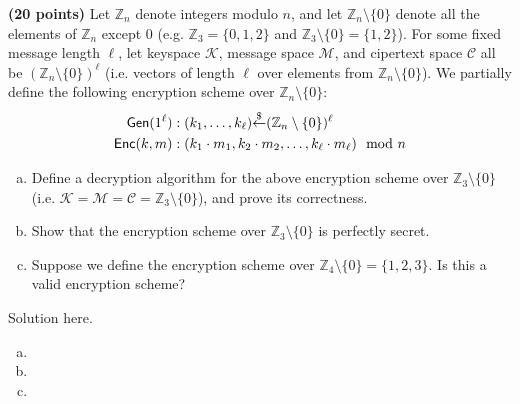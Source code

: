 \documentclass[12pt]{hw}
\begin{document}
\begin{exercise}
  \textbf{(20 points)} Let $\mathbb{Z}_n$ denote integers modulo $n$,
and let $\mathbb{Z}_n \setminus \{0\}$ denote all the elements of $\mathbb{Z}_n$ except $0$ (e.g. $\mathbb{Z}_3 = \{0, 1, 2\}$ and $\mathbb{Z}_3 \setminus \{0\} = \{1, 2\}$). 
For some fixed message length $\ell$,
let keyspace $\mathcal{K}$, message space $\mathcal{M}$, and cipertext space $\mathcal{C}$ all be $(\mathbb{Z}_{n} \setminus \{0\})^\ell$ (i.e. vectors of length $\ell$ over elements from $\mathbb{Z}_{n} \setminus \{0\}$).
We partially define the following encryption scheme over $\mathbb{Z}_n \setminus \{0\}$:
\begin{align*}
    \mathsf{Gen}(1^\ell) &: (k_1, \dots, k_\ell) {\overset{\$}{\leftarrow}} (\mathbb{Z}_{n} \setminus \{0\})^\ell\\
    \mathsf{Enc}(k, m) &: (k_1 \cdot m_1, k_2 \cdot m_2, \dots, k_\ell \cdot m_\ell)\mod n
\end{align*}
\begin{enumerate}[(a)]
    \item Define a decryption algorithm for the above encryption scheme over $\mathbb{Z}_3 \setminus \{0\}$
    (i.e. $\mathcal{K} = \mathcal{M} = \mathcal{C} = \mathbb{Z}_{3} \setminus \{0\}$), 
    and prove its correctness.
    \item 
    Show that the encryption scheme over $\mathbb{Z}_{3} \setminus \{0\}$ is perfectly secret.
    \item Suppose we define the encryption scheme over $\mathbb{Z}_4 \setminus \{0\}=\{1,2,3\}$. 
    Is this a valid encryption scheme?
\end{enumerate}
\end{exercise}

\begin{answer}
  Solution here.

  \begin{enumerate}[(a)]
  \item

  \item

  \item
  \end{enumerate}

\end{answer}

\end{document}
